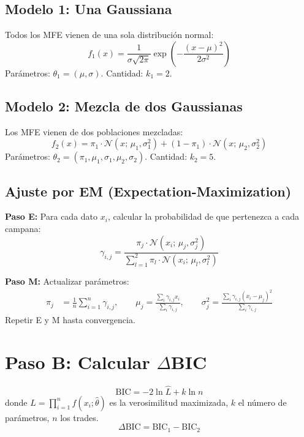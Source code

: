 \documentclass[11pt,a4paper]{article}
\begin{document}
\subsection{Modelo 1: Una Gaussiana}

Todos los MFE vienen de una sola distribuci\'on normal:
\begin{equation}
f_1(x) = \frac{1}{\sigma\sqrt{2\pi}} \exp\!\left(-\frac{(x-\mu)^2}{2\sigma^2}\right)
\end{equation}
Par\'ametros: $\theta_1 = (\mu, \sigma)$. Cantidad: $k_1 = 2$.

\subsection{Modelo 2: Mezcla de dos Gaussianas}

Los MFE vienen de dos poblaciones mezcladas:
\begin{equation}
f_2(x) = \pi_1 \cdot \mathcal{N}(x;\, \mu_1, \sigma_1^2) + (1-\pi_1) \cdot \mathcal{N}(x;\, \mu_2, \sigma_2^2)
\end{equation}
Par\'ametros: $\theta_2 = (\pi_1, \mu_1, \sigma_1, \mu_2, \sigma_2)$. Cantidad: $k_2 = 5$.

\subsection{Ajuste por EM (Expectation-Maximization)}

\textbf{Paso E:} Para cada dato $x_i$, calcular la probabilidad de que pertenezca a cada campana:
\begin{equation}
\gamma_{i,j} = \frac{\pi_j \cdot \mathcal{N}(x_i;\, \mu_j, \sigma_j^2)}{\sum_{l=1}^{2} \pi_l \cdot \mathcal{N}(x_i;\, \mu_l, \sigma_l^2)}
\end{equation}

\textbf{Paso M:} Actualizar par\'ametros:
\begin{align}
\pi_j &= \frac{1}{n}\sum_{i=1}^{n} \gamma_{i,j}, \qquad
\mu_j = \frac{\sum_i \gamma_{i,j} x_i}{\sum_i \gamma_{i,j}}, \qquad
\sigma_j^2 = \frac{\sum_i \gamma_{i,j}(x_i - \mu_j)^2}{\sum_i \gamma_{i,j}}
\end{align}
Repetir E y M hasta convergencia.

\section{Paso B: Calcular $\Delta$BIC}

\begin{tcolorbox}[formula, title=BIC y $\Delta$BIC]
\begin{equation}
\text{BIC} = -2\ln\hat{L} + k\ln n
\end{equation}
donde $\hat{L} = \prod_{i=1}^n f(x_i;\hat\theta)$ es la verosimilitud maximizada, $k$ el n\'umero de par\'ametros, $n$ los trades.
\begin{equation}
\boxed{\Delta\text{BIC} = \text{BIC}_1 - \text{BIC}_2}
\end{equation}
\end{tcolorbox}
\end{document}
